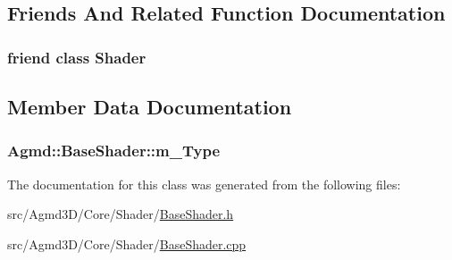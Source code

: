 \subsection{Friends And Related Function Documentation}
\hypertarget{class_agmd_1_1_base_shader_a03c2d524ace9ade9c3f55b43c99bcea1}{
\subsubsection[{Shader}]{\setlength{\rightskip}{0pt plus 5cm}friend class {\bf Shader}\hspace{0.3cm}{\ttfamily [friend]}}}\label{class_agmd_1_1_base_shader_a03c2d524ace9ade9c3f55b43c99bcea1}


\subsection{Member Data Documentation}
\hypertarget{class_agmd_1_1_base_shader_ac0bbd74caaf0776c9a7f030693b8d6ba}{
\subsubsection[{m\+\_\+\+Type}]{ Agmd\+::\+Base\+Shader\+::m\+\_\+\+Type\hspace{0.3cm}{\ttfamily [protected]}}}\label{class_agmd_1_1_base_shader_ac0bbd74caaf0776c9a7f030693b8d6ba}


The documentation for this class was generated from the following files\+:\begin{DoxyCompactItemize}
\item 
src/\+Agmd3\+D/\+Core/\+Shader/\hyperlink{_base_shader_8h}{Base\+Shader.\+h}\item 
src/\+Agmd3\+D/\+Core/\+Shader/\hyperlink{_base_shader_8cpp}{Base\+Shader.\+cpp}\end{DoxyCompactItemize}
